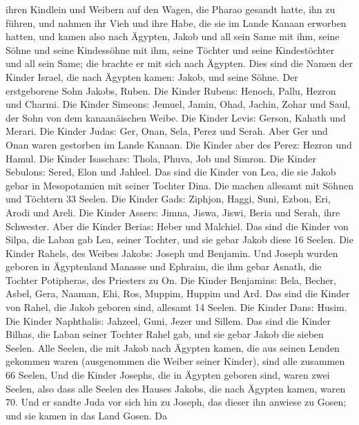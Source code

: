 ihren Kindlein und Weibern auf den Wagen, die Pharao gesandt hatte, ihn
zu führen,  und nahmen ihr Vieh und ihre Habe, die sie im
Lande Kanaan erworben hatten, und kamen also nach Ägypten, Jakob und all
sein Same mit ihm,  seine Söhne und seine Kindessöhne mit
ihm, seine Töchter und seine Kindestöchter und all sein Same; die
brachte er mit sich nach Ägypten.  Dies sind die Namen der
Kinder Israel, die nach Ägypten kamen: Jakob, und seine Söhne. Der
erstgeborene Sohn Jakobs, Ruben.  Die Kinder Rubens: Henoch,
Pallu, Hezron und Charmi.  Die Kinder Simeons: Jemuel,
Jamin, Ohad, Jachin, Zohar und Saul, der Sohn von dem kanaanäischen
Weibe.  Die Kinder Levis: Gerson, Kahath und Merari.
 Die Kinder Judas: Ger, Onan, Sela, Perez und Serah. Aber
Ger und Onan waren gestorben im Lande Kanaan. Die Kinder aber des Perez:
Hezron und Hamul.  Die Kinder Isaschars: Thola, Phuva, Job
und Simron.  Die Kinder Sebulons: Sered, Elon und Jahleel.
 Das sind die Kinder von Lea, die sie Jakob gebar in
Mesopotamien mit seiner Tochter Dina. Die machen allesamt mit Söhnen und
Töchtern 33 Seelen.  Die Kinder Gads: Ziphjon, Haggi, Suni,
Ezbon, Eri, Arodi und Areli.  Die Kinder Assers: Jimna,
Jiswa, Jiswi, Beria und Serah, ihre Schwester. Aber die Kinder Berias:
Heber und Malchiel.  Das sind die Kinder von Silpa, die
Laban gab Lea, seiner Tochter, und sie gebar Jakob diese 16 Seelen.
 Die Kinder Rahels, des Weibes Jakobs: Joseph und Benjamin.
 Und Joseph wurden geboren in Ägyptenland Manasse und
Ephraim, die ihm gebar Asnath, die Tochter Potipheras, des Priesters zu
On.  Die Kinder Benjamins: Bela, Becher, Asbel, Gera,
Naaman, Ehi, Ros, Muppim, Huppim und Ard.  Das sind die
Kinder von Rahel, die Jakob geboren sind, allesamt 14 Seelen.
 Die Kinder Dans: Husim.  Die Kinder
Naphthalis: Jahzeel, Guni, Jezer und Sillem.  Das sind die
Kinder Bilhas, die Laban seiner Tochter Rahel gab, und sie gebar Jakob
die sieben Seelen.  Alle Seelen, die mit Jakob nach Ägypten
kamen, die aus seinen Lenden gekommen waren (ausgenommen die Weiber
seiner Kinder), sind alle zusammen 66 Seelen,  Und die
Kinder Josephs, die in Ägypten geboren sind, waren zwei Seelen, also
dass alle Seelen des Hauses Jakobs, die nach Ägypten kamen, waren 70.
 Und er sandte Juda vor sich hin zu Joseph, das dieser ihn
anwiese zu Gosen; und sie kamen in das Land Gosen.  Da
